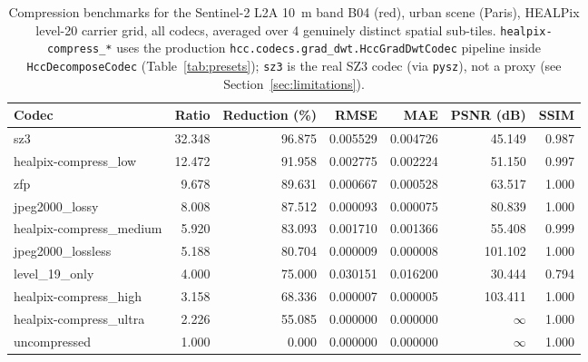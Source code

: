\begin{table}[t]
\centering
\caption{Compression benchmarks for the Sentinel-2 L2A \SI{10}{m} band B04 (red), urban scene (Paris), HEALPix level-20 carrier grid, all codecs, averaged over 4 genuinely distinct spatial sub-tiles. \texttt{healpix-compress\_*} uses the production \texttt{hcc.codecs.grad\_dwt.HccGradDwtCodec} pipeline inside \texttt{HccDecomposeCodec} (Table~\ref{tab:presets}); \texttt{sz3} is the real SZ3 codec (via \texttt{pysz}), not a proxy (see Section~\ref{sec:limitations}).}
\label{tab:benchmarks_urban}
\begin{tabular}{@{}lrrrrrr@{}}
\toprule
Codec & Ratio & Reduction (\%) & RMSE & MAE & PSNR (dB) & SSIM \\
\midrule
sz3                      & 32.348 & 96.875 & 0.005529 & 0.004726 & 45.149    & 0.987 \\
healpix-compress\_low    & 12.472 & 91.958 & 0.002775 & 0.002224 & 51.150    & 0.997 \\
zfp                      & 9.678  & 89.631 & 0.000667 & 0.000528 & 63.517    & 1.000 \\
jpeg2000\_lossy          & 8.008  & 87.512 & 0.000093 & 0.000075 & 80.839    & 1.000 \\
healpix-compress\_medium & 5.920  & 83.093 & 0.001710 & 0.001366 & 55.408    & 0.999 \\
jpeg2000\_lossless       & 5.188  & 80.704 & 0.000009 & 0.000008 & 101.102   & 1.000 \\
level\_19\_only          & 4.000  & 75.000 & 0.030151 & 0.016200 & 30.444    & 0.794 \\
healpix-compress\_high   & 3.158  & 68.336 & 0.000007 & 0.000005 & 103.411   & 1.000 \\
healpix-compress\_ultra  & 2.226  & 55.085 & 0.000000 & 0.000000 & $\infty$  & 1.000 \\
uncompressed             & 1.000  & 0.000  & 0.000000 & 0.000000 & $\infty$  & 1.000 \\
\bottomrule
\end{tabular}
\end{table}

